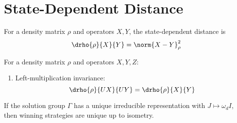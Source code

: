 \documentclass{article}
\begin{document}
\section{State-Dependent Distance}

\begin{definition}\label{def:state-distance}
For a density matrix $\rho$ and operators $X,Y$, the state-dependent distance is
\[\drho{\rho}{X}{Y} = \norm{X - Y}^2_\rho\]
\end{definition}

\begin{theorem}\label{thm:state-distance-props}
For a density matrix $\rho$ and operators $X, Y, Z$:
\begin{enumerate}
\item Left-multiplication invariance: 
\[\drho{\rho}{UX}{UY} = \drho{\rho}{X}{Y}\]
\end{enumerate}
\end{theorem}

\begin{theorem}\label{thm:exact-self-test}
If the solution group $\Gamma$ has a unique irreducible representation with $J \mapsto \omega_d I$, then winning strategies are unique up to isometry.
\end{theorem}
\end{document}
